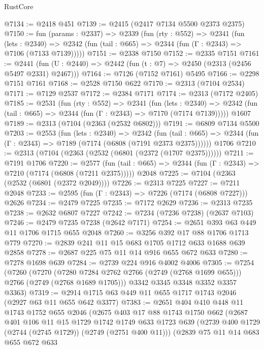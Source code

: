 \begin{lexlean}{RustCore}
\begin{coremodule}
@7134 := @2418 @451
@7139 := @2415 (@2417 @7134 @5500 @2373 @2375)
@7150 := fun (params : @2337) =>
  @2339
    (fun (rty : @552) =>
    @2341
      (fun (lets : @2340) =>
      @2342 (fun (tail : @665) => @2344 (fun (Γ : @2343) => @7106 (@7133 @7139)))))
@7151 := @2338 @7150
@7152 := @2335 @7151
@7161 := @2441 (fun (U : @2440) => @2442 (fun (t : @7) => @2450 (@2313 (@2456 @5497 @2331) @2467)))
@7164 := @7126 (@7152 @7161) @5495
@7166 := @2298 @7151 @7161
@7168 := @2528 @7150 @622
@7170 := @2313 (@7104 @2534)
@7171 := @7129 @2537
@7172 := @2384 @7171
@7174 := @2313 (@7172 @2405)
@7185 := @2531
    (fun (rty : @552) =>
    @2341
      (fun (lets : @2340) =>
      @2342 (fun (tail : @665) => @2344 (fun (Γ : @2343) => @7170 (@7174 @7139)))))
    @1607
@7189 := @2313 (@7104 (@2363 (@2532 @6802)))
@7191 := @6809 @7134 @5500
@7203 := @2553
    (fun (lets : @2340) =>
    @2342
      (fun (tail : @665) => @2344 (fun (Γ : @2343) => @7189 (@7174 (@6808 (@7191 @2373 @2375))))))
    @1706
@7210 := @2313 (@7104 (@2363 (@2532 (@6801 (@2372 (@1707 @2375))))))
@7211 := @7191 @1706
@7220 := @2577
    (fun (tail : @665) => @2344 (fun (Γ : @2343) => @7210 (@7174 (@6808 (@7211 @2375)))))
    @2048
@7225 := @7104 (@2363 (@2532 (@6801 (@2372 @2049))))
@7226 := @2313 @7225
@7227 := @7211 @2048
@7233 := @2595 (fun (Γ : @2343) => @7226 (@7174 (@6808 @7227))) @2626
@7234 := @2479 @7225
@7235 := @7172 @2629
@7236 := @2313 @7235
@7238 := @2632 @6807 @7227
@7242 := @7234 (@7236 @7238) (@2637 @7103)
@7246 := @2479 @7235 @7238 (@2642 @7171)
@7254 := @2651 @393 @63 @449 @11 @1706 @1715 @655 @2048
@7260 := @3256 @392 @17 @88 @1706 @1713 @779
@7270 := @2839 @241 @11 @15 @683 @1705 @1712 @633 @1688 @639 @2858
@7278 := @2687 @225 @75 @11 @14 @916 @655 @672 @633
@7280 := @7278 @1698 @639
@7284 := @2739 @224 @916 @4002 @4006
@7305 := @7254
    (@7260
      (@7270 (@7280 @7284 @2762 @2766 (@2749 (@2768 @1699 @655))) @2766 (@2749 (@2768 @1689 @1705)))
      @3342
      @3345
      @3348
      @3352
      @3357
      @3363)
@7319 := @2914 @1715 @63 @449 @11 @655 @1717 @1743 @2046 (@2927 @63 @11 @655 @642 @3377)
@7383 := @2651
    @404
    @410
    @448
    @11
    @1743
    @1752
    @655
    @2046
    (@2675
      @403
      @17
      @88
      @1743
      @1750
      @662
      (@2687
        @401
        @106
        @11
        @15
        @1729
        @1742
        @1749
        @633
        @1723
        @639
        (@2739 @400 @1729 (@2744 (@2745 @1729)) (@2749 (@2751 @400 @11)))
        (@2839
          @75
          @11
          @14
          @683
          @655
          @672
          @633

\end{coremodule}
\end{lexlean}
